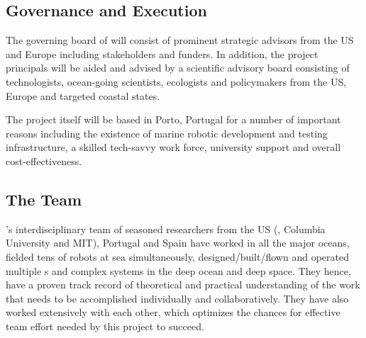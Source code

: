 


\subsection{Governance and Execution}


The governing board of \pro will consist of prominent strategic
advisors from the US and Europe including stakeholders and funders. In
addition, the project principals will be aided and advised by a
scientific advisory board consisting of technologists, ocean-going
scientists, ecologists and policymakers from the US, Europe and
targeted coastal states.

The project itself will be based in Porto, Portugal for a number of
important reasons including the existence of marine robotic
development and testing infrastructure, a skilled tech-savvy work
force, university support and overall cost-effectiveness.

\subsection{The Team}

\proe’s interdisciplinary team of seasoned researchers from the US
(\orge, Columbia University and MIT), Portugal and Spain have worked
in all the major oceans, fielded tens of robots at sea simultaneously,
designed/built/flown and operated multiple \smle s and complex systems
in the deep ocean and deep space. They hence, have a proven track
record of theoretical and practical understanding of the work that
needs to be accomplished individually and collaboratively. They have
also worked extensively with each other, which optimizes the chances
for effective team effort needed by this project to succeed.

